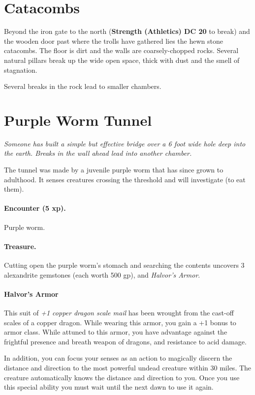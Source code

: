 \section{Catacombs}

Beyond the iron gate to the north (\textbf{Strength (Athletics) DC 20} to break)
and the wooden door past where the trolls have gathered lies the hewn stone
catacombs. The floor is dirt and the walls are coarsely-chopped rocks. Several natural
pillars break up the wide open space, thick with dust and the smell of stagnation.

Several breaks in the rock lead to smaller chambers.

\section{Purple Worm Tunnel}

\textit{Someone has built a simple but effective bridge over a 6 foot wide hole
deep into the earth. Breaks in the wall ahead lead into another chamber.}

The tunnel was made by a juvenile purple worm that has since grown to adulthood.
It senses creatures crossing the threshold and will investigate (to eat them).

\paragraph{Encounter (5 xp).} Purple worm.

\paragraph{Treasure.} Cutting open the purple worm's stomach and searching the contents
uncovers 3 alexandrite gemstones (each worth 500 gp), and \textit{Halvor's Armor}.

\paragraph{Halvor's Armor} This suit of \textit{+1 copper dragon scale mail} has been
wrought from the cast-off scales of a copper dragon. While wearing this armor,
you gain a +1 bonus to armor class. While attuned to this armor, you have
advantage against the frightful presence and breath weapon of dragons, and resistance
to acid damage.

In addition, you can focus your senses as an action to magically
discern the distance and direction to the most powerful undead creature within 30
miles. The creature automatically knows the distance and direction to you.
Once you use this special ability you must wait until the next dawn to use it again.

